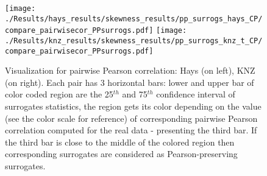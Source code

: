 \documentclass[letterpaper,11pt]{article}
\begin{document}
\begin{figure}
\texttt{[image: ./Results/hays\_results/skewness\_results/pp\_surrogs\_hays\_CP/compare\_pairwisecor\_PPsurrogs.pdf]}  
\texttt{[image: ./Results/knz\_results/skewness\_results/pp\_surrogs\_knz\_t\_CP/compare\_pairwisecor\_PPsurrogs.pdf]} 
\caption{Visualization for pairwise Pearson correlation: Hays (on left), KNZ (on right). Each pair has 3 horizontal bars: lower and upper bar of color coded region are the 25$^{th}$ and 75$^{th}$ confidence interval of surrogates statistics, the region gets its color depending on the value (see the color scale for reference) of corresponding pairwise Pearson correlation computed for the real data - presenting the third bar. If the third bar is close to the middle of the colored region then corresponding surrogates are considered as Pearson-preserving surrogates.}\label{fig:check_pairwisecor}
\end{figure}
\end{document}
